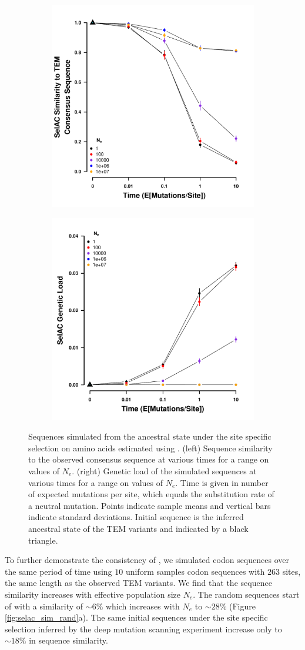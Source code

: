 \documentclass[12pt]{article}
\begin{document}
\begin{figure}[h]
    \centering
    \begin{subfigure}
        \centering
        \includegraphics[width=.45\textwidth]{img/simulated_dist_time_SELAC_ancest.pdf}
    \end{subfigure}
    \begin{subfigure}
        \centering
        \includegraphics[width=.45\textwidth]{img/simulated_gl_time_SELAC_ancest.pdf}
    \end{subfigure}
    \caption{Sequences simulated from the ancestral state under the site specific selection on amino acids estimated using \selac. 
    (left) Sequence similarity to the observed consensus sequence at various times for a range on values of $N_e$.
    (right) Genetic load of the simulated sequences at various times for a range on values of $N_e$.
    Time is given in number of expected mutations per site, which equals the substitution rate of a neutral mutation.
    Points indicate sample means and vertical bars indicate standard deviations. Initial sequence is the inferred ancestral state of the TEM variants and indicated by a black triangle.}
    \label{fig:selac_sim}
\end{figure}

To further demonstrate the consistency of \selac, we simulated codon sequences over the same period of time using $10$ uniform samples codon sequences with $263$ sites, the same length as the observed TEM variants.
We find that the sequence similarity increases with effective population size $N_e$.
The random sequences start of with a similarity of $\sim6 \%$ which increases with $N_e$ to $\sim28 \%$ (Figure \ref{fig:selac_sim_rand}a).
The same initial sequences under the site specific selection inferred by the deep mutation scanning experiment increase only to $\sim18 \%$ in sequence similarity.
\end{document}
